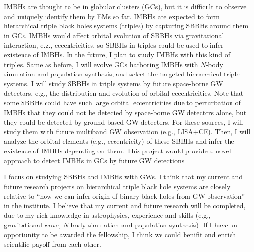 \documentclass[12pt,a4paper,sans]{article}%
\begin{document}
IMBHs are thought to be in globular clusters (GCs),
but it is difficult to observe and uniquely identify them by EMs so far. IMBHs are
expected to form hierarchical triple black holes systems (triples) by capturing SBBHs
around them in GCs. IMBHs would affect orbital evolution of SBBHs via gravitational
interaction, e.g., eccentricities, so SBBHs in triples could be used to infer existence of
IMBHs. In the future, I plan to study IMBHs with this kind of triples. Same as before, I will evolve GCs harboring IMBHs with $N$-body
simulation and population synthesis, and
select the targeted hierarchical triple systems. I will study SBBHs in triple systems by future space-borne GW detectors,
e.g., the distribution and evolution of orbital
eccentricities. Note that some SBBHs could have such large orbital eccentricities due to perturbation of IMBHs that they
could not be
detected by space-borne GW detectors alone, but they could be detected by ground-based GW detectors. For these sources,
I will study them with future multiband GW observation (e.g., LISA+CE). Then, I will analyze the orbital elements (e.g., eccentricity) of
these SBBHs and infer the existence of IMBHs depending on them. This project would provide a novel approach to detect IMBHs in GCs by future GW detections.  

I focus on studying SBBHs and IMBHs with GWs. I think that my current and future research projects on
hierarchical triple
black hole systems are closely relative to ``how we can infer origin of binary black holes from GW observation'' in the institute. I believe that my current and future research will be completed, due to my rich knowledge in astrophysics,
experience and skills (e.g., gravitational wave, $N$-body
simulation and population synthesis). If I have an opportunity to be awarded the fellowship, I think we could benifit and enrich scientific payoff from each other. 




%
\end{document}
